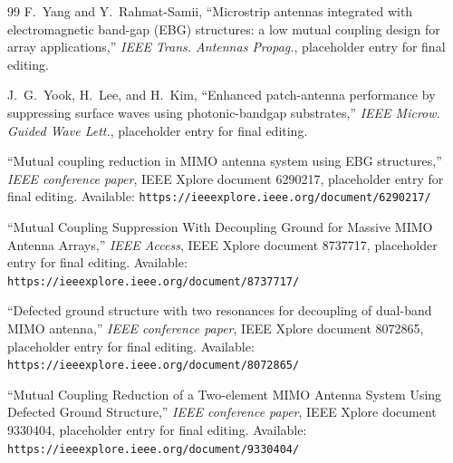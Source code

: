 \documentclass[journal]{IEEEtran}
\begin{document}
\begin{thebibliography}{99}
F.~Yang and Y.~Rahmat-Samii, ``Microstrip antennas integrated with electromagnetic band-gap (EBG) structures: a low mutual coupling design for array applications,'' \emph{IEEE Trans. Antennas Propag.}, placeholder entry for final editing.

J.~G.~Yook, H.~Lee, and H.~Kim, ``Enhanced patch-antenna performance by suppressing surface waves using photonic-bandgap substrates,'' \emph{IEEE Microw. Guided Wave Lett.}, placeholder entry for final editing.

``Mutual coupling reduction in MIMO antenna system using EBG structures,'' \emph{IEEE conference paper}, IEEE Xplore document 6290217, placeholder entry for final editing. Available: \texttt{https://ieeexplore.ieee.org/document/6290217/}

``Mutual Coupling Suppression With Decoupling Ground for Massive MIMO Antenna Arrays,'' \emph{IEEE Access}, IEEE Xplore document 8737717, placeholder entry for final editing. Available: \texttt{https://ieeexplore.ieee.org/document/8737717/}

``Defected ground structure with two resonances for decoupling of dual-band MIMO antenna,'' \emph{IEEE conference paper}, IEEE Xplore document 8072865, placeholder entry for final editing. Available: \texttt{https://ieeexplore.ieee.org/document/8072865/}

``Mutual Coupling Reduction of a Two-element MIMO Antenna System Using Defected Ground Structure,'' \emph{IEEE conference paper}, IEEE Xplore document 9330404, placeholder entry for final editing. Available: \texttt{https://ieeexplore.ieee.org/document/9330404/}
\end{thebibliography}
\end{document}
